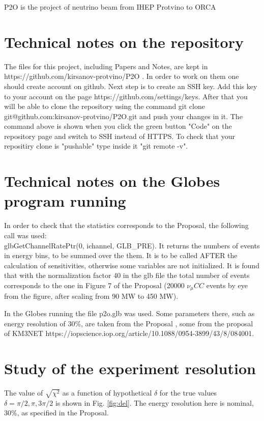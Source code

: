 \documentclass[prd,showpacs,groupedaddress,superscriptaddress,amsmath,amssymb]{revtex4-2} %
\begin{document}
 P2O is the project of neutrino beam from IHEP Protvino to ORCA \cite{Akindinov:2019flp}


\section{Technical notes on the repository}


 The files for this project, including Papers and Notes, are kept in https://github.com/kirsanov-protvino/P2O . In order to work
on them one should create account on github. Next step is to create an SSH key. Add this key to your account on the page https://github.com/settings/keys.
After that you will be able to clone the repository using the command git clone git@github.com:kirsanov-protvino/P2O.git and push your changes in it.
The command above is shown when you click the green button "Code" on the repository page and switch to SSH instead of HTTPS.
To check that your repositiry clone is "pushable" type inside it "git remote -v".


\section{Technical notes on the Globes program running}


 In order to check that the statistics corresponds to the Proposal, the following call was used: \\
glbGetChannelRatePtr(0, ichannel, GLB\_PRE).
It returns the numbers of events in energy bins, to be summed over the them. It is to be called AFTER the calculation of sensitivities,
otherwise some variables are not initialized. It is found that with the normalization factor 40 in the glb file the total number of
events corresponds to the one in Figure 7 of the Proposal \cite{Akindinov:2019flp} (20000 $\nu_{\mu}CC$ events by eye from the figure,
after scaling from 90 MW to 450 MW).

 In the Globes running the file p2o.glb was used. Some parameters there, such as energy resolution of 30\%, are taken from the
Proposal \cite{Akindinov:2019flp}, some from the proposal of KM3NET https://iopscience.iop.org/article/10.1088/0954-3899/43/8/084001.


\section{Study of the experiment resolution}


 The value of $\sqrt{\chi^2}$ as a function of hypothetical $\delta$ for the true values $\delta = \pi/2, \pi, 3\pi/2$ is shown
in Fig. \ref{fig:del}. The energy resolution here is nominal, 30\%, as specified in the Proposal.
\end{document}
